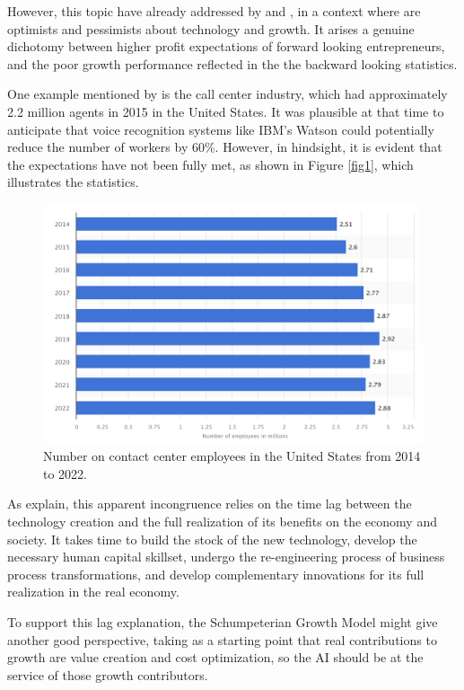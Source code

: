 \documentclass[preprint, 3p,
authoryear]{elsarticle} %
\begin{document}
However, this topic have already addressed by \citep{paradox} and
\citep{Nicholas}, in a context where are optimists and pessimists about
technology and growth. It arises a genuine dichotomy between higher
profit expectations of forward looking entrepreneurs, and the poor
growth performance reflected in the the backward looking statistics.

One example mentioned by \citep{paradox} is the call center industry,
which had approximately 2.2 million agents in 2015 in the United States.
It was plausible at that time to anticipate that voice recognition
systems like IBM's Watson could potentially reduce the number of workers
by 60\%. However, in hindsight, it is evident that the expectations have
not been fully met, as shown in Figure \ref{fig1}, which illustrates the
statistics.

\begin{figure}

{\centering \includegraphics[width=0.7\linewidth]{../Views/contact_center_employees_US} 

}

\caption{\label{fig1}Number on contact center employees in the United States from 2014 to 2022.}\label{fig:fig1}
\end{figure}

As \citep{paradox} explain, this apparent incongruence relies on the
time lag between the technology creation and the full realization of its
benefits on the economy and society. It takes time to build the stock of
the new technology, develop the necessary human capital skillset,
undergo the re-engineering process of business process transformations,
and develop complementary innovations for its full realization in the
real economy.

To support this lag explanation, the Schumpeterian Growth Model might
give another good perspective, taking as a starting point that real
contributions to growth are value creation and cost optimization, so the
AI should be at the service of those growth contributors.
\end{document}
